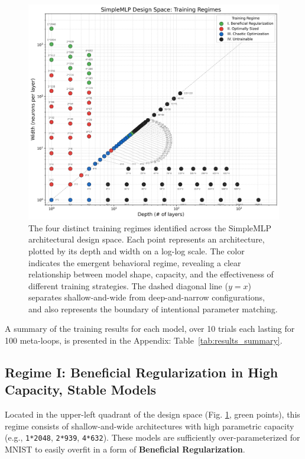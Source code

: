 \documentclass[conference]{IEEEtran}
\begin{document}
\begin{figure}[ht]
\centering
\includegraphics[width=\textwidth]{SimpleMLP_Heatmap_Regimes.png}
\caption{The four distinct training regimes identified across the SimpleMLP architectural design space. Each point represents an architecture, plotted by its depth and width on a log-log scale. The color indicates the emergent behavioral regime, revealing a clear relationship between model shape, capacity, and the effectiveness of different training strategies. The dashed diagonal line ($y=x$) separates shallow-and-wide from deep-and-narrow configurations, and also represents the boundary of intentional parameter matching.}
\label{fig:regime_map}
\end{figure}

A summary of the training results for each model, over 10 trials each lasting for 100 meta-loops, is presented in the Appendix: Table~\ref{tab:results_summary}.

\subsection{Regime I: Beneficial Regularization in High Capacity, Stable Models}

Located in the upper-left quadrant of the design space (Fig. \ref{fig:regime_map}, green points), this regime consists of shallow-and-wide architectures with high parametric capacity (e.g., \texttt{1*2048}, \texttt{2*939}, \texttt{4*632}). These models are sufficiently over-parameterized for MNIST to easily overfit in a form of \textbf{Beneficial Regularization}.
\end{document}
